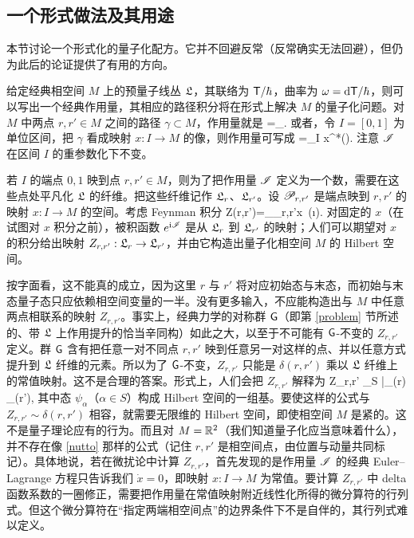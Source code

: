 \subsection{一个形式做法及其用途}\label{uses}

本节讨论一个形式化的量子化配方。它并不回避反常（反常确实无法回避），但仍为此后的论证提供了有用的方向。

给定经典相空间 $M$ 上的预量子线丛 ${\mathfrak L}$，其联络为 ${\sf T}/\hbar$，曲率为 $\omega={\mathrm d} {\sf T} /\hbar$，则可以写出一个经典作用量，其相应的路径积分将在形式上解决 $M$ 的量子化问题。对 $M$ 中两点 $r,r'\in M$ 之间的路径 $\gamma\subset M$，作用量就是
\be\label{wiff}\sI=\int_\gamma \sT .\ee
或者，令 $I=[0,1]$ 为单位区间，把 $\gamma$ 看成映射 $x:I\to M$ 的像，则作用量可写成
\be\label{iff} \sI =\int_I  x^*(\sT ). \ee
注意 ${\mathscr I}$ 在区间 $I$ 的重参数化下不变。

若 $I$ 的端点 $0,1$ 映到点 $r,r'\in M$，则为了把作用量 ${\mathscr I}$ 定义为一个数，需要在这些点处平凡化 ${\mathfrak L}$ 的纤维。把这些纤维记作 ${\mathfrak L}_r$、${\mathfrak L}_{r'}$。设 ${\mathscr P}_{r,r'}$ 是端点映到 $r,r'$ 的映射 $x:I\to M$ 的空间。考虑 Feynman 积分
\be\label{hiff} Z(r,r')=\int_{\pP_{r,r'}}\D x \,\exp(\i \sI). \ee
对固定的 $x$（在试图对 $x$ 积分之前），被积函数 $e^{{\mathrm i} {\mathscr I}}$ 是从 ${\mathfrak L}_r$ 到 ${\mathfrak L}_{r'}$ 的映射；人们可以期望对 $x$ 的积分给出映射 $Z_{r,r'}:{\mathfrak L}_r\to {\mathfrak L}_{r'}$，并由它构造出量子化相空间 $M$ 的 Hilbert 空间。

按字面看，这不能真的成立，因为这里 $r$ 与 $r'$ 将对应初始态与末态，而初始与末态量子态只应依赖相空间变量的一半。没有更多输入，不应能构造出与 $M$ 中任意两点相联系的映射 $Z_{r,r'}$。事实上，经典力学的对称群 ${\text{\sf G}}$（即第 \ref{problem} 节所述的、带 ${\mathfrak L}$ 上作用提升的恰当辛同构）如此之大，以至于不可能有 ${\text{\sf G}}$-不变的 $Z_{r,r'}$ 定义。群 ${\text{\sf G}}$ 含有把任意一对不同点 $r,r'$ 映到任意另一对这样的点、并以任意方式提升到 ${\mathfrak L}$ 纤维的元素。所以为了 ${\text{\sf G}}$-不变，$Z_{r,r'}$ 只能是 $\delta(r,r')$ 乘以 ${\mathfrak L}$ 纤维上的常值映射。这不是合理的答案。形式上，人们会把 $Z_{r,r'}$ 解释为
\be\label{nutto} Z_{r,r'} \sum_{\alpha\in S} \bar\psi_\alpha(r) \psi_\alpha(r'), \ee
其中态 $\psi_\alpha$（$\alpha\in S$）构成 Hilbert 空间的一组基。要使这样的公式与 $Z_{r,r'}\sim\delta(r,r')$ 相容，就需要无限维的 Hilbert 空间，即使相空间 $M$ 是紧的。这不是量子理论应有的行为。而且对 $M={\mathbb R}^2$（我们知道量子化应当意味着什么），并不存在像 \eqref{nutto} 那样的公式（记住 $r,r'$ 是相空间点，由位置与动量共同标记）。具体地说，若在微扰论中计算 $Z_{r,r'}$，首先发现的是作用量 ${\mathscr I}$ 的经典 Euler--Lagrange 方程只告诉我们 $\dot x=0$，即映射 $x:I\to M$ 为常值。要计算 $Z_{r,r'}$ 中 delta 函数系数的一圈修正，需要把作用量在常值映射附近线性化所得的微分算符的行列式。但这个微分算符在“指定两端相空间点”的边界条件下不是自伴的，其行列式难以定义。

